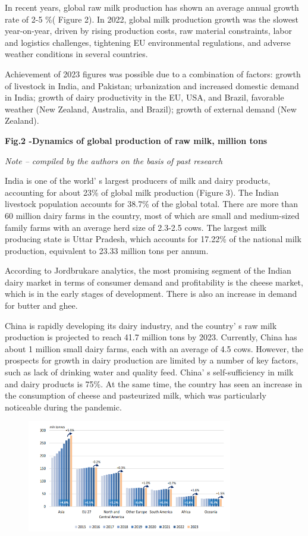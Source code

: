 In recent years, global raw milk production has shown an average annual
growth rate of 2-5 \%( Figure 2). In 2022, global milk production growth
was the slowest year-on-year, driven by rising production costs, raw
material constraints, labor and logistics challenges, tightening EU
environmental regulations, and adverse weather conditions in several
countries.

Achievement of 2023 figures was possible due to a combination of
factors: growth of livestock in India, and Pakistan; urbanization and
increased domestic demand in India; growth of dairy productivity in the
EU, USA, and Brazil, favorable weather (New Zealand, Australia, and
Brazil); growth of external demand (New Zealand).

{\bfseries Fig.2 -Dynamics of global production of raw milk, million tons}

\emph{Note -- compiled by the authors on the basis of past research}

India is one of the world' s largest producers of milk
and dairy products, accounting for about 23\% of global milk production
(Figure 3). The Indian livestock population accounts for 38.7\% of the
global total. There are more than 60 million dairy farms in the country,
most of which are small and medium-sized family farms with an average
herd size of 2.3-2.5 cows. The largest milk producing state is Uttar
Pradesh, which accounts for 17.22\% of the national milk production,
equivalent to 23.33 million tons per annum.

According to Jordbrukare analytics, the most promising segment of the
Indian dairy market in terms of consumer demand and profitability is the
cheese market, which is in the early stages of development. There is
also an increase in demand for butter and ghee.

China is rapidly developing its dairy industry, and the
country' s raw milk production is projected to reach 41.7
million tons by 2023. Currently, China has about 1 million small dairy
farms, each with an average of 4.5 cows. However, the prospects for
growth in dairy production are limited by a number of key factors, such
as lack of drinking water and quality feed. China' s
self-sufficiency in milk and dairy products is 75\%. At the same time,
the country has seen an increase in the consumption of cheese and
pasteurized milk, which was particularly noticeable during the pandemic.


\begin{figure}[H]
	\centering
	\includegraphics[width=0.8\textwidth]{media/ekon2/image2}
	\caption*{}
\end{figure}


